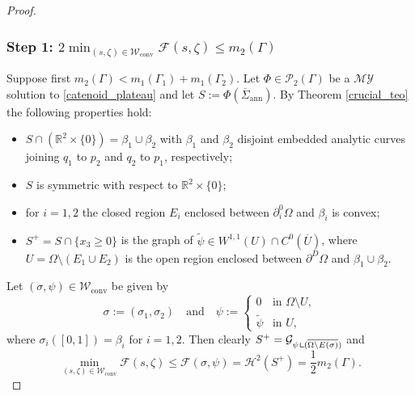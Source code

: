 \documentclass[JEP,XML,SOM,Unicode, NoFloatCountersInSection,published]{cedram}
\newcommand{\R}{\mathbb{R}}
\let\Om\Omega
\newcommand\admclassconv{{\mathcal W_\mathrm{conv}}}
\newcommand{\immclosedann}{\Phi({\overline\Sigma}_\mathrm{ann})}
\newcommand{\resa}{\mathop{\hbox{\vrule height 7pt width 0.5pt depth 0pt
\vrule height 0.5pt width 6pt depth 0pt}}\nolimits}
\newcommand{\resb}{\mathop{\hbox{\vrule height 4pt width 0.5pt depth 0pt
\vrule height 0.5pt width 3pt depth 0pt}}\nolimits}
\newcommand{\res}{\mathchoice{\resa}{\resa}{\resb}{\resb}}
\theoremstyle{definition}
\begin{document}
\skpt
\begin{proof}\vspace*{-.5\baselineskip}
\subsubsection*{Step 1:
$2\min_{(s,\zeta)\in \admclassconv}\mathcal F(s,\zeta)\le m_2(\Gamma)$}

Suppose first $m_2(\Gamma)<m_1(\Gamma_1)+m_1(\Gamma_2)$.
Let $\Phi\in\mathcal{P}_2(\Gamma)$ be a $\mathcal{MY}$ solution to \eqref{catenoid_plateau} and let $S:=\immclosedann$. By Theorem \ref{crucial_teo} the following properties hold:
\begin{itemize}
\item $S\cap(\R^2\times\{0\})=\beta_1\cup\beta_2$ with $\beta_1$ and $\beta_2$ disjoint
embedded analytic curves joining $q_1$ to $p_2$ and $q_2$ to $p_1$, respectively;
\item $S$ is symmetric with respect to $\R^2\times\{0\}$;
\item for $i=1,2$ the closed
region $E_i$ enclosed between $\partial^0_i\Om$ and $\beta_i$ is convex;
\item $S^+=S\cap\{x_3\ge0\}$ is the graph of $\widetilde\psi\in W^{1,1}(U)\cap C^0(\overline U)$, where $U=\Om\setminus( E_1\cup E_2)$ is the open
region enclosed between $\partial^D\Om$ and $\beta_1\cup\beta_2$.
\end{itemize}
Let $(\sigma,\psi)\in\admclassconv$ be given by
\begin{equation*}
\sigma:=(\sigma_1,\sigma_2)\quad\text{and}\quad\psi:=\begin{cases}
0&\text{in } \Om\setminus U,
\\
\widetilde{\psi}&\text{in } U,
\end{cases}
\end{equation*}
where $\sigma_i([0,1])=\beta_i$ for $i=1,2$.
Then clearly $S^+=\mathcal{G}_{\psi\res(\overline{\Om\setminus E(\sigma)})}$ and
\begin{equation*}
\min_{(s,\zeta)\in\admclassconv}\mathcal{F}(s,\zeta)\le \mathcal{F}(\sigma,\psi)=\mathcal{H}^2(S^+)=\frac12m_2(\Gamma).
\end{equation*}


\end{proof}
\end{document}
